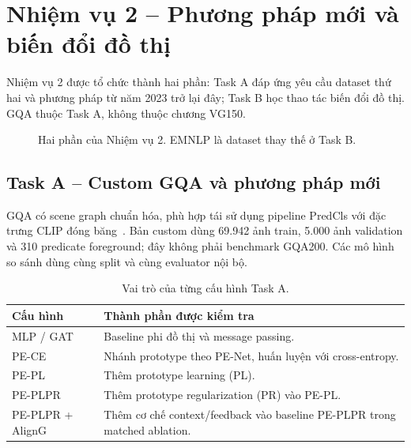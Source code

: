 \clearpage
\section{Nhiệm vụ 2 -- Phương pháp mới và biến đổi đồ thị}
Nhiệm vụ 2 được tổ chức thành hai phần: Task A đáp ứng yêu cầu dataset thứ hai
và phương pháp từ năm 2023 trở lại đây; Task B học thao tác biến đổi đồ thị.
GQA thuộc Task A, không thuộc chương VG150.

\begin{figure}[H]\centering
{}
\caption{Hai phần của Nhiệm vụ 2. EMNLP là dataset thay thế ở Task B.}
\end{figure}

\subsection{Task A -- Custom GQA và phương pháp mới}
GQA có scene graph chuẩn hóa, phù hợp tái sử dụng pipeline PredCls với
đặc trưng CLIP đóng băng~\cite{hudson2019gqa}. Bản custom dùng 69.942 ảnh
train, 5.000 ảnh validation và 310 predicate foreground; đây không phải
benchmark GQA200. Các mô hình so sánh dùng cùng split và cùng evaluator nội bộ.

\begin{table}[H]\centering\small
\caption{Vai trò của từng cấu hình Task A.}\label{tab:gqamethod}
\begin{tabularx}{\linewidth}{@{}>{\raggedright\arraybackslash}p{26mm}X@{}}\toprule
Cấu hình & Thành phần được kiểm tra\\\midrule
MLP / GAT & Baseline phi đồ thị và message passing.\\
PE-CE & Nhánh prototype theo PE-Net, huấn luyện với cross-entropy.\\
PE-PL & Thêm prototype learning (PL).\\
PE-PLPR & Thêm prototype regularization (PR) vào PE-PL.\\
PE-PLPR + AlignG & Thêm cơ chế context/feedback vào baseline PE-PLPR trong matched ablation.\\
\bottomrule\end{tabularx}\end{table}

